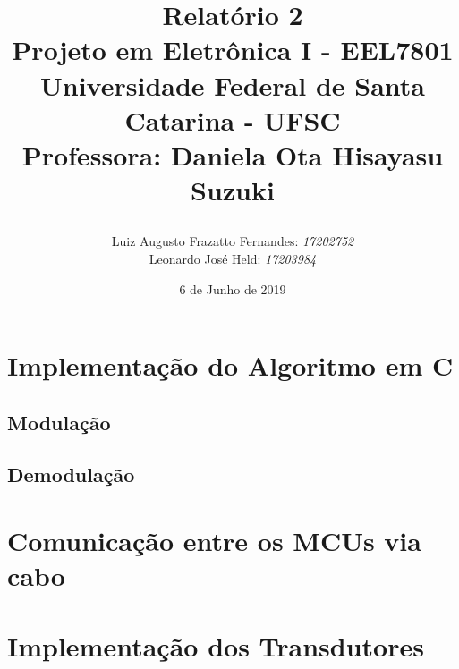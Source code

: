 \documentclass[11pt,a4paper]{report}
\title{Relatório 2  \\
	Projeto em Eletrônica I - EEL7801 \\ \vfill
	\normalsize{Universidade Federal de Santa Catarina - UFSC \\
		Professora: Daniela Ota Hisayasu Suzuki}
	\author{
		{Luiz Augusto Frazatto Fernandes: \it{17202752}} \\
		{Leonardo José Held: \it{17203984}}
}
}
\date{6 de Junho de 2019}
\begin{document}
	\maketitle
\chapter{Implementação do Algoritmo em C}
	\section{Modulação}

	\section{Demodulação}

\chapter{Comunicação entre os MCUs via cabo}
	
	\section{}
	
\chapter{Implementação dos Transdutores}
	
	
\end{document}

